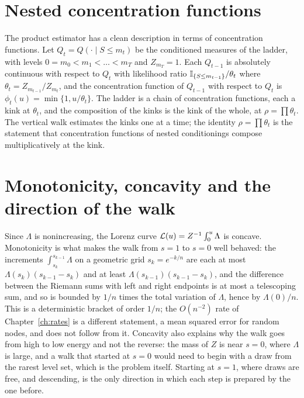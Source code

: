 \section{Nested concentration functions}

The product estimator has a clean description in terms of concentration functions. Let $Q_t = Q(\cdot \mid S \le m_t)$ be the conditioned measures of the ladder, with levels $0 = m_0 < m_1 < \dots < m_T$ and $Z_{m_T} = 1$. Each $Q_{t-1}$ is absolutely continuous with respect to $Q_t$ with likelihood ratio $\mathbb{I}_{\{S \le m_{t-1}\}} / \theta_t$ where $\theta_t = Z_{m_{t-1}} / Z_{m_t}$, and the concentration function of $Q_{t-1}$ with respect to $Q_t$ is $\phi_t(u) = \min\{1, u / \theta_t\}$. The ladder is a chain of concentration functions, each a kink at $\theta_t$, and the composition of the kinks is the kink of the whole, at $\rho = \prod \theta_t$. The vertical walk estimates the kinks one at a time; the identity $\rho = \prod \theta_t$ is the statement that concentration functions of nested conditionings compose multiplicatively at the kink.

\section{Monotonicity, concavity and the direction of the walk}

Since $\Lambda$ is nonincreasing, the Lorenz curve $\mathcal{L}(u) = Z^{-1} \int_0^u \Lambda$ is concave. Monotonicity is what makes the walk from $s = 1$ to $s = 0$ well behaved: the increments $\int_{s_{k}}^{s_{k-1}} \Lambda$ on a geometric grid $s_k = e^{-k/n}$ are each at most $\Lambda(s_k)(s_{k-1} - s_k)$ and at least $\Lambda(s_{k-1})(s_{k-1} - s_k)$, and the difference between the Riemann sums with left and right endpoints is at most a telescoping sum, and so is bounded by $1/n$ times the total variation of $\Lambda$, hence by $\Lambda(0)/n$. This is a deterministic bracket of order $1/n$; the $O(n^{-2})$ rate of Chapter~\ref{ch:rates} is a different statement, a mean squared error for random nodes, and does not follow from it. Concavity also explains why the walk goes from high to low energy and not the reverse: the mass of $Z$ is near $s = 0$, where $\Lambda$ is large, and a walk that started at $s = 0$ would need to begin with a draw from the rarest level set, which is the problem itself. Starting at $s = 1$, where draws are free, and descending, is the only direction in which each step is prepared by the one before.

